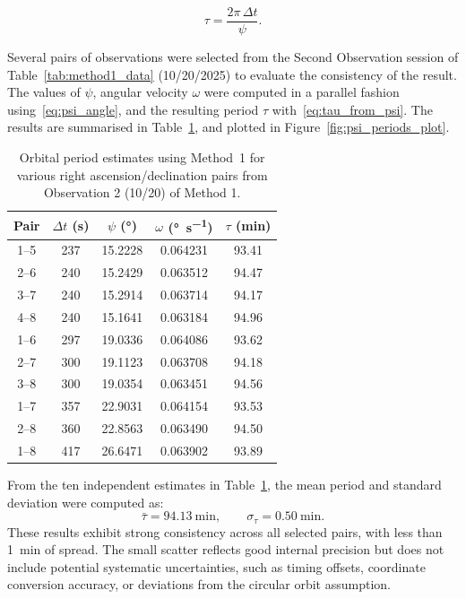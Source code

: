 \documentclass{article}
\begin{document}
\begin{equation}
    \tau = \frac{2\pi\,\Delta t}{\psi}.
    \label{eq:tau_from_psi}
\end{equation}

Several pairs of observations were selected from the Second Observation session of Table~\ref{tab:method1_data} (10/20/2025) to evaluate the consistency of the result. The values of $\psi$, angular velocity $\omega$ were computed in a parallel fashion using~\eqref{eq:psi_angle}, and the resulting period $\tau$ with~\eqref{eq:tau_from_psi}. The results are summarised in Table~\ref{tab:psi_periods}, and plotted in Figure~\ref{fig:psi_periods_plot}.

\begin{table}[H]
    \centering
    \caption{Orbital period estimates using Method~1 for various right ascension/declination pairs from Observation 2 (10/20) of Method 1.}
    \label{tab:psi_periods}
    \renewcommand{\arraystretch}{1.15}
    \begin{tabular}{|c|c|c|c|c|}
        \hline
        \textbf{Pair} & $\Delta t$ (\si{\second}) & $\psi$ (\si{\degree}) & $\omega$ (\si{\degree\per\second}) & $\tau$ (\si{\minute}) \\ \hline
        1--5 & 237 & 15.2228 & 0.064231 & 93.41 \\ \hline
        2--6 & 240 & 15.2429 & 0.063512 & 94.47 \\ \hline
        3--7 & 240 & 15.2914 & 0.063714 & 94.17 \\ \hline
        4--8 & 240 & 15.1641 & 0.063184 & 94.96 \\ \hline
        1--6 & 297 & 19.0336 & 0.064086 & 93.62 \\ \hline
        2--7 & 300 & 19.1123 & 0.063708 & 94.18 \\ \hline
        3--8 & 300 & 19.0354 & 0.063451 & 94.56 \\ \hline
        1--7 & 357 & 22.9031 & 0.064154 & 93.53 \\ \hline
        2--8 & 360 & 22.8563 & 0.063490 & 94.50 \\ \hline
        1--8 & 417 & 26.6471 & 0.063902 & 93.89 \\ \hline
    \end{tabular}
\end{table}

From the ten independent estimates in Table~\ref{tab:psi_periods}, the mean period and standard deviation were computed as:
\[
\bar{\tau} = \SI{94.13}{\minute}, \qquad \sigma_\tau = \SI{0.50}{\minute}.
\]
These results exhibit strong consistency across all selected pairs, with less than \SI{1}{\minute} of spread.  
The small scatter reflects good internal precision but does not include potential systematic uncertainties, such as timing offsets, coordinate conversion accuracy, or deviations from the circular orbit assumption.
\end{document}
